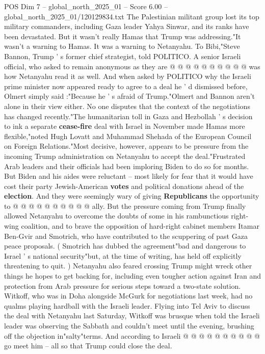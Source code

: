 \begin{textsample}{POS Dim 7 – global\_north\_2025\_01 – Score 6.00 – global\_north\_2025\_01/120129834.txt}
The Palestinian militant group lost its top military commanders, including Gaza leader Yahya Sinwar, and its ranks have been devastated.
But it wasn't really Hamas that Trump was addressing."It wasn't a warning to Hamas.
It was a warning to Netanyahu.
To Bibi,"Steve Bannon, Trump ' s former chief strategist, told POLITICO.
A senior Israeli official, who asked to remain anonymous as they are @ @ @ @ @ @ @ @ @ @ was how Netanyahu read it as well.
And when asked by POLITICO why the Israeli prime minister now appeared ready to agree to a deal he ' d dismissed before, Olmert simply said :"Because he ' s afraid of Trump."Olmert and Bannon aren't alone in their view either.
No one disputes that the context of the negotiations has changed recently."The humanitarian toll in Gaza and Hezbollah ' s decision to ink a separate \textbf{cease-fire} deal with Israel in November made Hamas more flexible,"noted Hugh Lovatt and Muhammad Shehada of the European Council on Foreign Relations."Most decisive, however, appears to be pressure from the incoming Trump administration on Netanyahu to accept the deal."Frustrated Arab leaders and their officials had been imploring Biden to do so for months.
But Biden and his aides were reluctant -- most likely for fear that it would have cost their party Jewish-American \textbf{votes} and political donations ahead of the \textbf{election}.
And they were seemingly wary of giving \textbf{Republicans} the opportunity to @ @ @ @ @ @ @ @ @ @ ally.
But the pressure coming from Trump finally allowed Netanyahu to overcome the doubts of some in his rambunctious right-wing coalition, and to brave the opposition of hard-right cabinet members Itamar Ben-Gvir and Smotrich, who have contributed to the scuppering of past Gaza peace proposals. ( Smotrich has dubbed the agreement"bad and dangerous to Israel ' s national security"but, at the time of writing, has held off explicitly threatening to quit. ) Netanyahu also feared crossing Trump might wreck other things he hopes to get backing for, including even tougher action against Iran and protection from Arab pressure for serious steps toward a two-state solution.
Witkoff, who was in Doha alongside McGurk for negotiations last week, had no qualms playing hardball with the Israeli leader.
Flying into Tel Aviv to discuss the deal with Netanyahu last Saturday, Witkoff was brusque when told the Israeli leader was observing the Sabbath and couldn't meet until the evening, brushing off the objection in"salty"terms.
And according to Israeli @ @ @ @ @ @ @ @ @ @ go meet him -- all so that Trump could close the deal.

\end{textsample}
